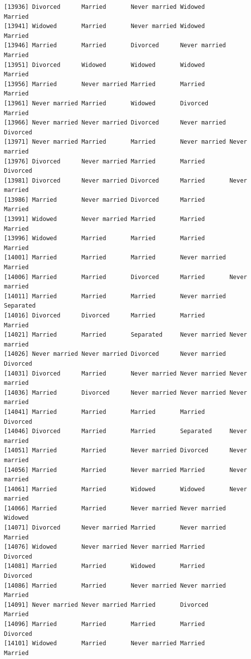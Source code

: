 \documentclass[
  letterpaper,
  DIV=11,
  numbers=noendperiod,
  oneside]{scrartcl}
\begin{document}
\begin{verbatim}
[13936] Divorced      Married       Never married Widowed       Married      
[13941] Widowed       Married       Never married Widowed       Married      
[13946] Married       Married       Divorced      Never married Married      
[13951] Divorced      Widowed       Widowed       Widowed       Married      
[13956] Married       Never married Married       Married       Married      
[13961] Never married Married       Widowed       Divorced      Married      
[13966] Never married Never married Divorced      Never married Divorced     
[13971] Never married Married       Married       Never married Never married
[13976] Divorced      Never married Married       Married       Divorced     
[13981] Divorced      Never married Divorced      Married       Never married
[13986] Married       Never married Divorced      Married       Married      
[13991] Widowed       Never married Married       Married       Married      
[13996] Widowed       Married       Married       Married       Married      
[14001] Married       Married       Married       Never married Married      
[14006] Married       Married       Divorced      Married       Never married
[14011] Married       Married       Married       Never married Separated    
[14016] Divorced      Divorced      Married       Married       Married      
[14021] Married       Married       Separated     Never married Never married
[14026] Never married Never married Divorced      Never married Divorced     
[14031] Divorced      Married       Never married Never married Never married
[14036] Married       Divorced      Never married Never married Never married
[14041] Married       Married       Married       Married       Divorced     
[14046] Divorced      Married       Married       Separated     Never married
[14051] Married       Married       Never married Divorced      Never married
[14056] Married       Married       Never married Married       Never married
[14061] Married       Married       Widowed       Widowed       Never married
[14066] Married       Married       Never married Never married Widowed      
[14071] Divorced      Never married Married       Never married Married      
[14076] Widowed       Never married Never married Married       Divorced     
[14081] Married       Married       Widowed       Married       Divorced     
[14086] Married       Married       Never married Never married Married      
[14091] Never married Never married Married       Divorced      Married      
[14096] Married       Married       Married       Married       Divorced     
[14101] Widowed       Married       Never married Married       Married      

\end{verbatim}
\end{document}
